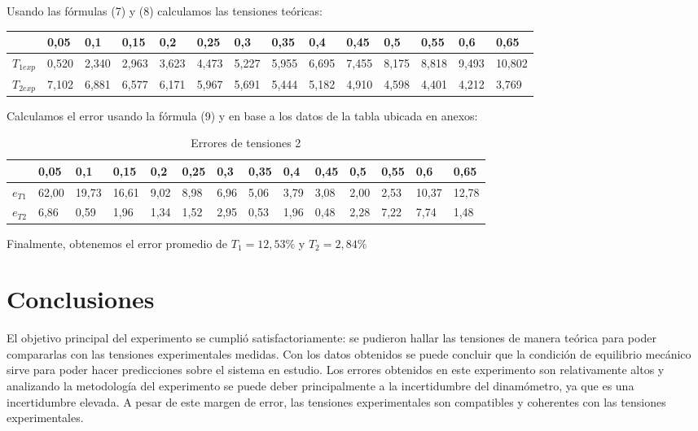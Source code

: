 \documentclass[a4paper]{article}
\begin{document}
Usando las fórmulas (7) y (8) calculamos las tensiones teóricas: 

\begin{table}[H]
\centering
\begin{tabular}{l|l|l|l|l|l|l|l|l|l|l|l|l|l|}
\cline{2-14}
                         & 0,05  & 0,1   & 0,15  & 0,2   & 0,25  & 0,3   & 0,35  & 0,4   & 0,45  & 0,5   & 0,55  & 0,6   & 0,65   \\ \hline
\multicolumn{1}{|l|}{$T_{1 exp}$} & 0,520 & 2,340 & 2,963 & 3,623 & 4,473 & 5,227 & 5,955 & 6,695 & 7,455 & 8,175 & 8,818 & 9,493 & 10,802 \\ \hline
\multicolumn{1}{|l|}{$T_{2 exp}$} & 7,102 & 6,881 & 6,577 & 6,171 & 5,967 & 5,691 & 5,444 & 5,182 & 4,910 & 4,598 & 4,401 & 4,212 & 3,769  \\ \hline
\end{tabular}
\end{table}

Calculamos el error usando la fórmula (9) y en base a los datos de la tabla ubicada en anexos:

\begin{table}[H]
\centering
\begin{tabular}{l|l|l|l|l|l|l|l|l|l|l|l|l|l|}
\cline{2-14}
                         & 0,05  & 0,1   & 0,15  & 0,2  & 0,25 & 0,3  & 0,35 & 0,4  & 0,45 & 0,5  & 0,55 & 0,6   & 0,65  \\ \hline
\multicolumn{1}{|l|}{$e_{T1}$} & 62,00 & 19,73 & 16,61 & 9,02 & 8,98 & 6,96 & 5,06 & 3,79 & 3,08 & 2,00 & 2,53 & 10,37 & 12,78 \\ \hline
\multicolumn{1}{|l|}{$e_{T2}$} & 6,86  & 0,59  & 1,96  & 1,34 & 1,52 & 2,95 & 0,53 & 1,96 & 0,48 & 2,28 & 7,22 & 7,74  & 1,48  \\ \hline
\end{tabular}
\caption{Errores de tensiones 2}
\end{table}

Finalmente, obtenemos el error promedio de $T_1=12,53\%$ y $T_2=2,84\%$
\section{Conclusiones}

El objetivo principal del experimento se cumplió satisfactoriamente: se pudieron hallar las tensiones de manera teórica para poder compararlas con las tensiones experimentales medidas. Con los datos obtenidos se puede concluir que la condición de equilibrio mecánico sirve para poder hacer predicciones sobre el sistema en estudio. Los errores obtenidos en este experimento son relativamente altos y analizando la metodología del experimento se puede deber principalmente a la incertidumbre del dinamómetro, ya que es una incertidumbre elevada. A pesar de este margen de error, las tensiones experimentales son compatibles y coherentes con las tensiones experimentales.  
\end{document}
